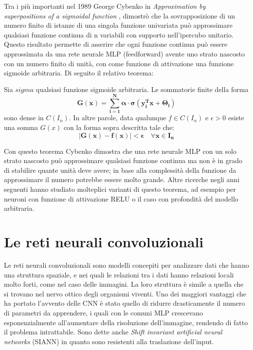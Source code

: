 Tra i più importanti nel 1989 George Cybenko in \textit{Approximation by superpositions of a sigmoidal function} \cite{cybenko1989approximation},
dimostrò che la sovrapposizione di un numero finito di istanze di una singola funzione univariata può approssimare qualsiasi funzione continua 
di n variabili con supporto nell'ipercubo unitario. Questo risultato permette di asserire che ogni funzione continua può essere approssimata da 
una rete neurale MLP (feedforward) avente uno strato nascosto con un numero finito di unità, con come funzione di attivazione una funzione sigmoide arbitraria.
Di seguito il relativo teorema:
\begin{theorem}
    \label{thm:cybenko_1}
    Sia $sigma$ qualsiasi funzione sigmoide arbitraria. Le sommatorie finite della forma
    \begin{equation}
        \mathbf{G(x) = \sum_{i=1}^{N} \alpha \cdot \sigma(y_i^Tx + \Theta_i)}
    \end{equation}
    sono dense in $C(I_n)$. In altre parole, data qualunque $f \in C(I_n)$ e $\epsilon > 0$ esiste una somma $G(x)$
    con la forma sopra descritta tale che:
    \begin{equation}
        \mathbf{|G(x) - f(x)| < \epsilon \quad \forall x \in I_n}
    \end{equation}
\end{theorem}

Con questo teorema Cybenko dimostra che una rete neurale MLP con un solo strato nascosto può approssimare qualsiasi funzione continua
ma non è in grado di stabilire quante unità deve avere; in base alla complessità della funzione da approssimare il numero potrebbe essere molto grande.
Altre ricerche negli anni seguenti hanno studiato molteplici varianti di questo teorema, ad esempio per neuroni con funzione di attivazione RELU 
o il caso con profondità del modello arbitraria.

\section{Le reti neurali convoluzionali}

Le reti neurali convoluzionali sono modelli concepiti per analizzare dati che hanno una struttura spaziale,
e nei quali le relazioni tra i dati hanno relazioni locali molto forti, come nel caso delle immagini.
La loro struttura è simile a quella che si trovano nel nervo ottico degli organismi viventi.
Uno dei maggiori vantaggi che ha portato l'avvento delle CNN è stato quello di ridurre drasticamente il numero di parametri da apprendere,
i quali con le comuni MLP crescevano esponenzialmente all'aumentare della risoluzione dell'immagine, rendendo di fatto il problema
intrattabile. 
Sono dette anche \textit{Shift invariant artificial neural networks} (SIANN) in quanto sono resistenti alla traslazione dell'input.

